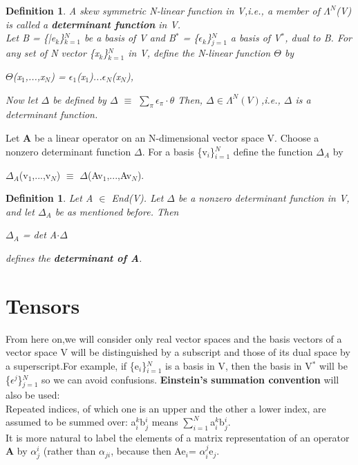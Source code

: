 \documentclass[12pt,a4paper]{article}
\newtheorem{defn}[thm]{Definition}
\begin{document}
\begin{defn}
A skew symmetric N-linear function in V,i.e., a member of $\Lambda^N$(V) is called a \textbf{determinant function} in V.\\
Let B = \{|e$_k$\}$^{N}_{k=1}$ be a basis of V and B$^*$ = \{$\epsilon_k$\}$^N_{j=1}$ a basis of V$^*$, dual to B. For any set of N vector \{x$_k$\}$^N_{k=1}$ in V, define the N-linear function $\Theta$ by \begin{center}
	$\Theta$(x$_1$,...,x$_N$) = $\epsilon_1$(x$_1$)...$\epsilon_N$(x$_N$),
\end{center} 
Now let $\Delta$ be defined by $\Delta$ $\equiv$ $\sum_{\pi}\epsilon_{\pi} \cdot \theta$ Then, $\Delta \in \Lambda^N(V)$,i.e., $\Delta$ is a determinant function.
\end{defn}
Let \textbf{A} be a linear operator on an N-dimensional vector space V. Choose a nonzero determinant function $\Delta$. For a basis \{v$_i$\}$^{N}_{i=1}$ define the function $\Delta_A$ by \begin{center}
$\Delta_A$(v$_1$,...,v$_N$) $\equiv$ $\Delta$(Av$_1$,...,Av$_N$).
\end{center}
\begin{defn}
Let A $\in$ End(V). Let $\Delta$ be a nonzero determinant function in V, and let $\Delta_A$ be as mentioned before. Then \begin{center}
$\Delta_A$ = det A$\cdot \Delta$
\end{center}
defines the \textbf{determinant of A}.\end{defn}
\section{Tensors}
From here on,we will consider only real vector spaces and the basis vectors of a vector space V will be distinguished by a subscript and those of its dual space by a superscript.For example, if \{e$_i$\}$^N_{i=1}$ is a basis in V, then the basis in V$^*$ will be \{$\epsilon^j$\}$^N_{j=1}$ so we can avoid confusions.\textbf{ Einstein's summation convention} will also be used:\\
Repeated indices, of which one is an upper and the other a lower index, are assumed to be summed over: a$^k_i$b$^i_j$ means $\sum^N_{i=1}$a$^k_i$b$^i_j$.\\
It is more natural to label the elements of a matrix representation of an operator \textbf{A} by $\alpha^i_j$ (rather than $\alpha_{ji}$, because then Ae$_i$= $\alpha^j_i$e$_j$.
\end{document}
